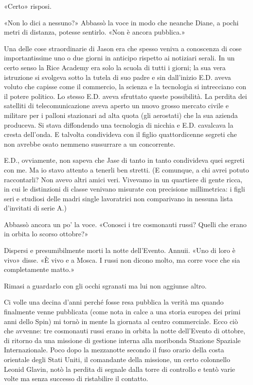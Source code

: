 «Certo» risposi.

«Non lo dici a nessuno?» Abbassò la voce in modo che neanche Diane, a
pochi metri di distanza, potesse sentirlo. «Non è ancora pubblica.»

Una delle cose straordinarie di Jason era che spesso veniva a conoscenza
di cose importantissime uno o due giorni in anticipo rispetto ai
notiziari serali. In un certo senso la Rice Academy era solo la scuola
di tutti i giorni; la sua vera istruzione si svolgeva sotto la tutela di
suo padre e sin dall'inizio E.D. aveva voluto che capisse come il
commercio, la scienza e la tecnologia si intrecciano con il potere
politico. Lo stesso E.D. aveva sfruttato queste possibilità. La perdita
dei satelliti di telecomunicazione aveva aperto un nuovo grosso mercato
civile e militare per i palloni stazionari ad alta quota (gli aerostati)
che la sua azienda produceva. Si stava diffondendo una tecnologia di
nicchia e E.D. cavalcava la cresta dell'onda. E talvolta condivideva con
il figlio quattordicenne segreti che non avrebbe osato nemmeno
sussurrare a un concorrente.

E.D., ovviamente, non sapeva che Jase di tanto in tanto condivideva quei
segreti con me. Ma io stavo attento a tenerli ben stretti. (E comunque,
a chi avrei potuto raccontarli? Non avevo altri amici veri. Vivevamo in
un quartiere di gente ricca, in cui le distinzioni di classe venivano
misurate con precisione millimetrica: i figli seri e studiosi delle
madri single lavoratrici non comparivano in nessuna lista d'invitati di
serie A.)

Abbassò ancora un po' la voce. «Conosci i tre cosmonauti russi? Quelli
che erano in orbita lo scorso ottobre?»

Dispersi e presumibilmente morti la notte dell'Evento. Annuii. «Uno di
loro è vivo» disse. «È vivo e a Mosca. I russi non dicono molto, ma
corre voce che sia completamente matto.»

Rimasi a guardarlo con gli occhi sgranati ma lui non aggiunse altro.

\separatorefiori

Ci volle una decina d'anni perché fosse resa pubblica la verità ma
quando finalmente venne pubblicata (come nota in calce a una storia
europea dei primi anni dello Spin) mi tornò in mente la giornata al
centro commerciale. Ecco ciò che avvenne: tre cosmonauti russi erano in
orbita la notte dell'Evento di ottobre, di ritorno da una missione di
gestione interna alla moribonda Stazione Spaziale Internazionale. Poco
dopo la mezzanotte secondo il fuso orario della costa orientale degli
Stati Uniti, il comandante della missione, un certo colonnello Leonid
Glavin, notò la perdita di segnale dalla torre di controllo e tentò
varie volte ma senza successo di ristabilire il contatto.

